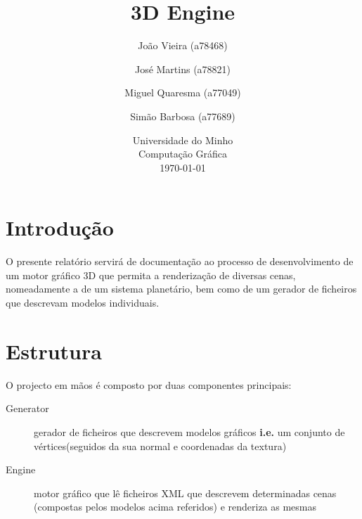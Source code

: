 \documentclass{article}
\begin{document}
\title{\vspace*{\fill}3D Engine}
\author{João Vieira (a78468) \and José Martins (a78821) \and Miguel Quaresma (a77049) \and Simão Barbosa (a77689)}
\date{%
    Universidade do Minho\\
    Computação Gráfica\\[2ex]%
    \today\vspace*{\fill}
}
\maketitle

\newpage

\tableofcontents

\newpage

\section{Introdução}
O presente relatório servirá de documentação ao processo de desenvolvimento de um motor gráfico 3D que permita a renderização de diversas cenas, nomeadamente a de um sistema planetário, bem como de um gerador de ficheiros que descrevam modelos individuais.

\newpage

\section{Estrutura}
O projecto em mãos é composto por duas componentes principais: 
\begin{description}
    \item [Generator] gerador de ficheiros que descrevem modelos gráficos \textbf{i.e.} um conjunto de vértices(seguidos da sua normal e coordenadas da textura) 
    \item [Engine] motor gráfico que lê ficheiros XML que descrevem determinadas cenas (compostas pelos modelos acima referidos) e renderiza as mesmas
\end{description}
\end{document}
